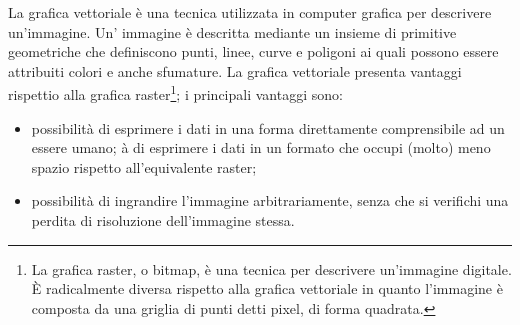 La grafica vettoriale \`e una tecnica utilizzata in computer grafica per descrivere 
un'immagine. 
Un' immagine \`e descritta mediante un insieme di primitive geometriche che definiscono punti, linee, curve e poligoni ai quali possono essere attribuiti colori e anche sfumature. La grafica vettoriale presenta  vantaggi rispettio alla grafica raster\footnote{La grafica raster, o bitmap, \`e una tecnica per descrivere un'immagine digitale. \`E radicalmente diversa rispetto alla grafica vettoriale in quanto l’immagine \`e composta da una griglia di punti detti pixel, di forma quadrata.}; i principali vantaggi sono:
\begin{itemize}
\item possibilit\`a di esprimere i dati in una forma direttamente comprensibile ad un essere umano;
\itempossibilit\`a di esprimere i dati in un formato che occupi (molto) meno spazio rispetto all'equivalente raster;
\item possibilit\`a di ingrandire l'immagine arbitrariamente, senza che si verifichi una perdita di risoluzione dell'immagine stessa.
\end{itemize}